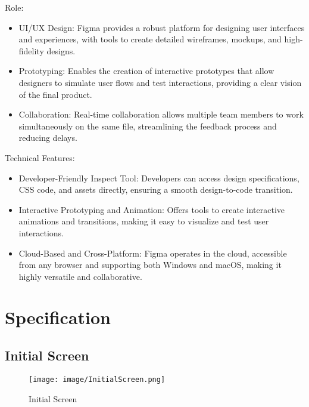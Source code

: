 \documentclass[conference]{IEEEtran}
\begin{document}
Role:
\begin{itemize}
    \item UI/UX Design: Figma provides a robust platform for designing user interfaces and experiences, with tools to create detailed wireframes, mockups, and high-fidelity designs.\\
    \item Prototyping: Enables the creation of interactive prototypes that allow designers to simulate user flows and test interactions, providing a clear vision of the final product.\\
    \item Collaboration: Real-time collaboration allows multiple team members to work simultaneously on the same file, streamlining the feedback process and reducing delays.\\
\end{itemize}

Technical Features:
\begin{itemize}
    \item Developer-Friendly Inspect Tool: Developers can access design specifications, CSS code, and assets directly, ensuring a smooth design-to-code transition.\\
    \item Interactive Prototyping and Animation: Offers tools to create interactive animations and transitions, making it easy to visualize and test user interactions.\\
    \item Cloud-Based and Cross-Platform: Figma operates in the cloud, accessible from any browser and supporting both Windows and macOS, making it highly versatile and collaborative.\\
\end{itemize}



\section{Specification}

\subsection{Initial Screen}

\begin{figure}[h!]
    \centering
    \texttt{[image: image/InitialScreen.png]}
    \caption{Initial Screen}
    \label{fig:enter-label}
\end{figure}
\end{document}
